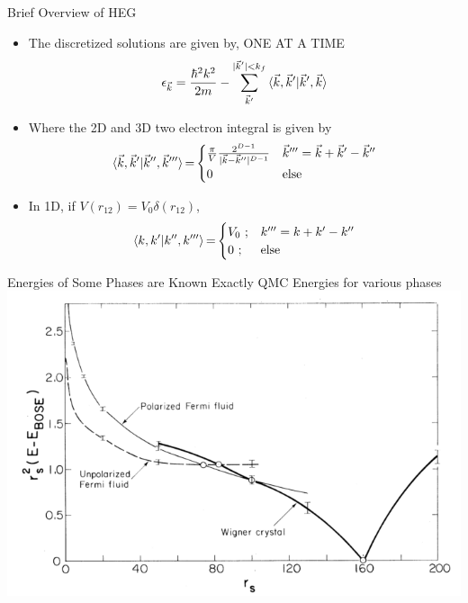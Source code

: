 \documentclass[10pt]{beamer}
\begin{document}
{{{{{{{\begin{frame}{Brief Overview of HEG}
	\begin{itemize}
		\item{The discretized solutions are given by, ONE AT A TIME
		\begin{eqnarray}\label{eq:hf_orb_energy}
			\epsilon_{\vec{k}}=
				\frac{\hbar^2 k^2}{2m} - \sum\limits_{\vec{k}'}^{|\vec{k}'|< k_f}
				\braket{\vec{k}, \vec{k}' |\vec{k}', \vec{k}}
		\end{eqnarray}
		}
		\item{Where the 2D and 3D two electron integral is given by
  		\begin{equation}
  			\braket{\vec{k}, \vec{k}'|\vec{k}'',\vec{k}'''}{=}
  				\begin{cases}
  				\frac{\pi}{V}\frac{2^{D-1}}{|\vec{k}-\vec{k}''|^{D-1}}
  				& \vec{k}''' = \vec{k}+\vec{k}'-\vec{k}'' \nonumber\\
  				0
  				& \text{else}
  				\end{cases}
  		\end{equation}
		}
		\item{ In 1D, if $V(r_{12}) = V_0\delta{(r_{12})}$,
		  \begin{equation}
  			\braket{k, k'|k'',k'''}{=}
  				\begin{cases}
  				V_0\text{ ;}
  				& k''' = k+k'-k'' \\
  				0\text{ ;}
  				& \text{else}
  				\end{cases}
		  \end{equation}
		}
	\end{itemize}
\end{frame}

{%

\begin{frame}{Energies of Some Phases are Known Exactly}
  \centering
	QMC Energies for various phases
	\includegraphics[width=.85\linewidth]{../figures/Ceperley_PhaseDiag.png}
\end{frame}


}}}}}}}}
\end{document}
